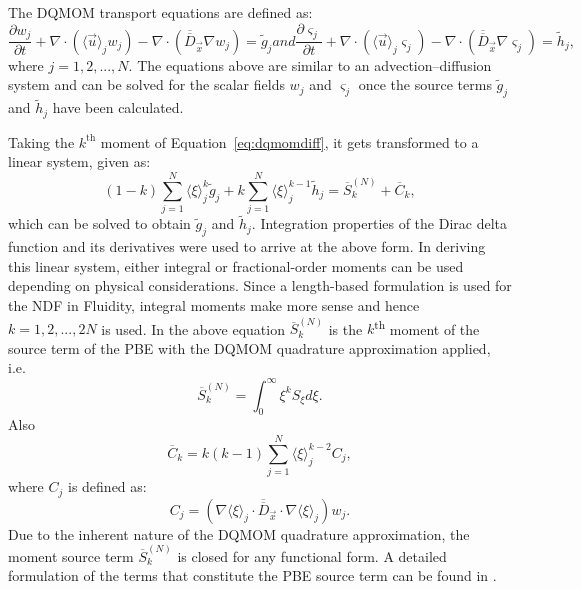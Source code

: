 The DQMOM transport equations are defined as:
\begin{subequations}
\begin{equation} \label{eq:dqmomweight}
\frac{\partial w_{j}}{\partial t} + \nabla \cdot \left( \langle \vec{u} \rangle_j w_j \right) - \nabla \cdot \left( \overline{\overline{D}}_{\vec{x}} \nabla w_j \right) = \widetilde{g}_{j}
\end{equation}
and 
\begin{equation} \label{eq:dqmomweightabscissa}
\frac{\partial \varsigma_{j}}{\partial t} + \nabla \cdot \left( \langle \vec{u} \rangle_j \varsigma_j \right) - \nabla \cdot \left( \overline{\overline{D}}_{\vec{x}} \nabla \varsigma_j \right)  = \widetilde{h}_{j},
\end{equation}
\end{subequations}
where $j=1,2,...,N$. 
The equations above are similar to an advection--diffusion system and can be solved for the scalar fields $w_j$ and $\varsigma_j$ once the source terms $\widetilde{g}_{j}$ and $\widetilde{h}_{j}$ have been calculated. 

Taking the $k^{\textrm{th}}$ moment of Equation~\eqref{eq:dqmomdiff}, it gets transformed to a linear system, given as:
\begin{equation} \label{eq:dqmom_lineq_raw}
(1-k) \sum_{j=1}^N \langle \xi \rangle_{j}^k \widetilde{g}_{j} + k \sum_{j=1}^N \langle \xi \rangle_{j}^{k-1} \widetilde{h}_{j} = \overline{S}_k^{(N)} + \overline{C}_k,
\end{equation}
which can be solved to obtain $\widetilde{g}_{j}$ and $\widetilde{h}_{j}$. Integration properties of the Dirac delta function and its derivatives were used to arrive at the above form. In deriving this linear system, either integral or fractional-order moments can be used depending on physical considerations. Since a length-based formulation is used for the NDF in Fluidity, integral moments make more sense and hence $k=1,2,...,2N$ is used.
In the above equation $\overline{S}_k^{(N)}$ is the $k$\textsuperscript{th} moment of the source term of the PBE with the DQMOM quadrature approximation applied, i.e.
\begin{equation}
\overline{S}_k^{(N)} = \int_{0}^{\infty} \xi^k S_{\xi} d\xi.
\label{eq:source_moment}
\end{equation}
Also
\begin{equation}
\overline{C}_k = k(k-1) \sum_{j=1}^N \langle \xi \rangle_{j}^{k-2} C_{j},
\end{equation}
where $C_j$ is defined as:
\begin{equation}
C_j =\left( \nabla \langle \xi \rangle_j \cdot \overline{\overline{D}}_{\vec{x}} \cdot \nabla \langle \xi \rangle_j \right) w_j.
\end{equation}
Due to the inherent nature of the DQMOM quadrature approximation, the moment source term $\overline{S}_k^{(N)}$ is closed for any functional form.
A detailed formulation of the terms that constitute the PBE source term can be found in \citet{bhutani2016}. 

